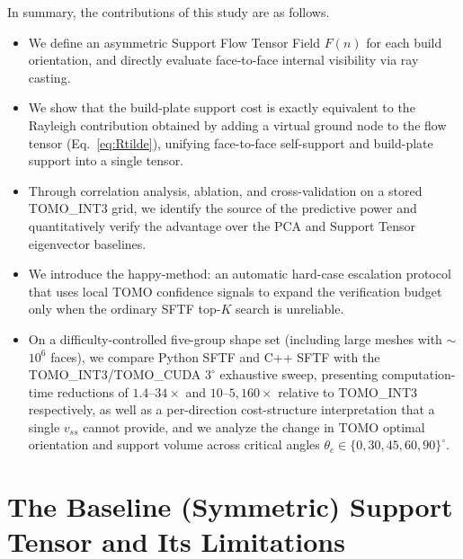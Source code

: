 \documentclass[11pt,a4paper]{article}
\begin{document}
In summary, the contributions of this study are as follows.
\begin{itemize}
\item We define an asymmetric Support Flow Tensor Field $F(n)$ for each build orientation, and directly evaluate face-to-face internal visibility via ray casting.
\item We show that the build-plate support cost is exactly equivalent to the Rayleigh contribution obtained by adding a virtual ground node to the flow tensor (Eq.~\eqref{eq:Rtilde}), unifying face-to-face self-support and build-plate support into a single tensor.
\item Through correlation analysis, ablation, and cross-validation on a stored TOMO\_INT3 grid, we identify the source of the predictive power and quantitatively verify the advantage over the PCA and Support Tensor eigenvector baselines.
\item We introduce the happy-method: an automatic hard-case escalation protocol that uses local TOMO confidence signals to expand the verification budget only when the ordinary SFTF top-$K$ search is unreliable.
\item On a difficulty-controlled five-group shape set (including large meshes with $\sim$$10^6$ faces), we compare Python SFTF and C++ SFTF with the TOMO\_INT3/TOMO\_CUDA $3^\circ$ exhaustive sweep, presenting computation-time reductions of $1.4$--$34\times$ and $10$--$5{,}160\times$ relative to TOMO\_INT3 respectively, as well as a per-direction cost-structure interpretation that a single $v_{ss}$ cannot provide, and we analyze the change in TOMO optimal orientation and support volume across critical angles $\theta_c\in\{0,30,45,60,90\}^\circ$.
\end{itemize}

\section{The Baseline (Symmetric) Support Tensor and Its Limitations}
\label{sec:support-tensor-limit}
\end{document}

